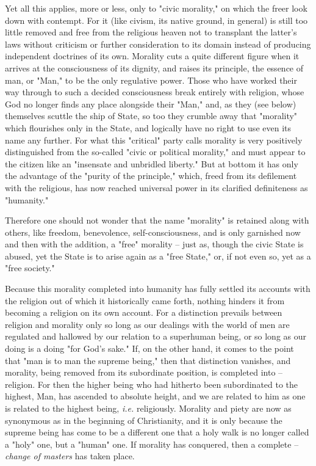 Yet all this applies, more or less, only to "{}civic morality,"{} on which the 
freer look down with contempt. For it (like civism, its native ground, in 
general) is still too little removed and free from the religious heaven not to 
transplant the latter's laws without criticism or further consideration to its 
domain instead of producing independent doctrines of its own. Morality cuts a 
quite different figure when it arrives at the consciousness of its dignity, 
and raises its principle, the essence of man, or "{}Man,"{} to be the only 
regulative power. Those who have worked their way through to such a decided 
consciousness break entirely with religion, whose God no longer finds any 
place alongside their "{}Man,"{} and, as they (see below) themselves scuttle 
the ship of State, so too they crumble away that "{}morality"{} which 
flourishes only in the State, and logically have no right to use even its name 
any further. For what this "{}critical"{} party calls morality is very 
positively distinguished from the so-called "{}civic or political morality,"{} 
and must appear to the citizen like an "{}insensate and unbridled liberty."{} 
But at bottom it has only the advantage of the "{}purity of the principle,"{} 
which, freed from its defilement with the religious, has now reached universal 
power in its clarified definiteness as "{}humanity."{}

Therefore one should not wonder that the name "{}morality"{} is retained along 
with others, like freedom, benevolence, self-consciousness, and is only 
garnished now and then with the addition, a "{}free"{} morality -- just as, 
though the civic State is abused, yet the State is to arise again as a "{}free 
State,"{} or, if not even so, yet as a "{}free society."{}

Because this morality completed into humanity has fully settled its accounts 
with the religion out of which it historically came forth, nothing hinders it 
from becoming a religion on its own account. For a distinction prevails 
between religion and morality only so long as our dealings with the world of 
men are regulated and hallowed by our relation to a superhuman being, or so 
long as our doing is a doing "{}for God's sake."{} If, on the other hand, it 
comes to the point that "{}man is to man the supreme being,"{} then that 
distinction vanishes, and morality, being removed from its subordinate 
position, is completed into -- religion. For then the higher being who had 
hitherto been subordinated to the highest, Man, has ascended to absolute 
height, and we are related to him as one is related to the highest being, 
\textit{i.e.} religiously. Morality and piety are now as synonymous as in the 
beginning of Christianity, and it is only because the supreme being has come 
to be a different one that a holy walk is no longer called a "{}holy"{} one, 
but a "{}human"{} one. If morality has conquered, then a complete -- 
\textit{change of masters} has taken place.

